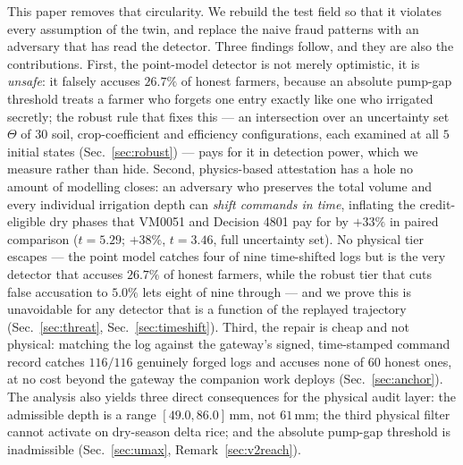 This paper removes that circularity. We rebuild the test field so that it violates every assumption of the twin, and replace the
naive fraud patterns with an adversary that has read the detector. Three
findings follow, and they are also the contributions. First, the point-model
detector is not merely optimistic, it is \emph{unsafe}: it falsely accuses
$26.7\%$ of honest farmers, because an absolute pump-gap threshold treats a
farmer who forgets one entry exactly like one who irrigated secretly; the
robust rule that fixes this --- an intersection over an uncertainty set
$\Theta$ of $30$ soil, crop-coefficient and efficiency configurations, each
examined at all $5$ initial states (Sec.~\ref{sec:robust}) --- pays for it in
detection power, which we measure rather than hide. Second, physics-based attestation has a hole no amount of
modelling closes: an adversary who preserves the total volume and every
individual irrigation depth can \emph{shift commands in time}, inflating the
credit-eligible dry phases that VM0051 and Decision 4801 pay for by $+33\%$
in paired comparison ($t=5.29$; $+38\%$, $t=3.46$, full uncertainty set). No
physical tier escapes --- the point model catches four of nine time-shifted logs but
is the very detector that accuses $26.7\%$ of honest farmers, while the robust
tier that cuts false accusation to $5.0\%$ lets eight of nine through --- and
we prove this is unavoidable for any detector that is a function of the
replayed trajectory (Sec.~\ref{sec:threat}, Sec.~\ref{sec:timeshift}).
Third, the repair is cheap and not physical: matching the log against the
gateway's signed, time-stamped command record catches $116/116$ genuinely
forged logs and accuses none of $60$ honest ones, at no cost beyond the gateway
the companion work deploys (Sec.~\ref{sec:anchor}). The analysis also yields three direct consequences for the physical audit layer: the admissible depth is a range $[49.0,86.0]$\,mm, not $61$\,mm; the third physical filter cannot activate on dry-season delta rice; and the absolute pump-gap threshold is inadmissible
(Sec.~\ref{sec:umax}, Remark~\ref{sec:v2reach}).
